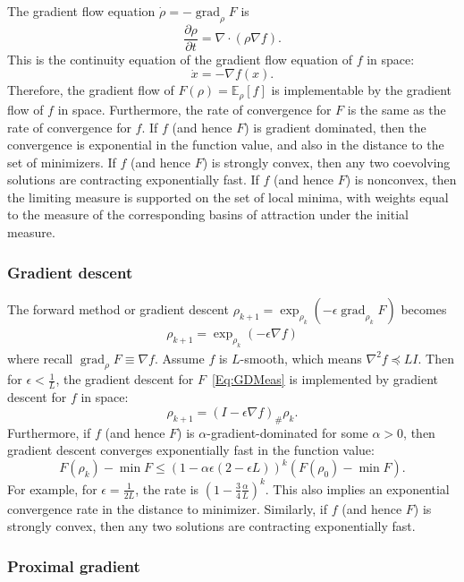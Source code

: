 \documentclass[final,12pt]{colt2018}
\newcommand{\E}{\mathbb{E}}
\renewcommand{\part}[2]{\frac{\partial #1}{\partial #2}}
\DeclareMathOperator{\grad}{grad}
\begin{document}
The gradient flow equation $\dot \rho = -\grad_\rho F$ is
$$\part{\rho}{t} = \nabla \cdot \left(\rho \nabla f \right).$$
This is  the continuity equation of the gradient flow equation of $f$ in space:
$$\dot x = -\nabla f(x).$$
Therefore, the gradient flow of $F(\rho) = \E_\rho[f]$ 
is implementable by the gradient flow of $f$ in space.
Furthermore, the rate of convergence for $F$ is the same as the rate of convergence for $f$.
If $f$ (and hence $F$) is gradient dominated, then the convergence is exponential in the function value, and also in the distance to the set of minimizers.
If $f$ (and hence $F$) is strongly convex, then any two coevolving solutions are contracting exponentially fast.
If $f$ (and hence $F$) is nonconvex, 
then the limiting measure is supported on the set of local minima, with weights equal to the measure of the corresponding basins of attraction under the initial measure.



\subsubsection{Gradient descent}
\label{Sec:GDF}

The forward method or gradient descent $\rho_{k+1} = \exp_{\rho_k}(-\epsilon \grad_{\rho_k} F)$ becomes
\begin{align}\label{Eq:GDMeas}
\rho_{k+1} = \exp_{\rho_k}(-\epsilon \nabla f)
\end{align}
where recall $\grad_\rho F \equiv \nabla f$.
Assume $f$ is $L$-smooth, which means $\nabla^2 f \preceq L I$.
Then for $\epsilon < \frac{1}{L}$, the gradient descent for $F$~\eqref{Eq:GDMeas} is implemented by gradient descent for $f$ in space:
$$\rho_{k+1} = (I - \epsilon \nabla f)_\# \rho_k.$$
Furthermore, if $f$ (and hence $F$) is $\alpha$-gradient-dominated for some $\alpha > 0$, then gradient descent converges exponentially fast in the function value:
$$F(\rho_k) - \min F \le (1-\alpha \epsilon (2-\epsilon L))^k (F(\rho_0)-\min F).$$
For example, for $\epsilon = \frac{1}{2L}$, the rate is $(1-\frac{3}{4}\frac{\alpha}{L})^k$.
This also implies an exponential convergence rate in the distance to minimizer.
Similarly, if $f$ (and hence $F$) is strongly convex, then any two solutions are contracting exponentially fast.


\subsubsection{Proximal gradient}
\label{Sec:PGF}
\end{document}
